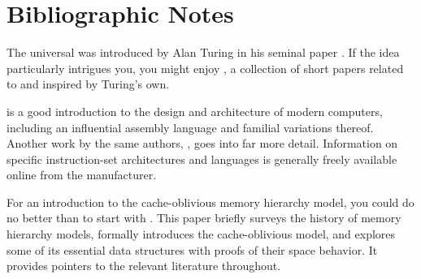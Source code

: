 \section{Bibliographic Notes}\label{background:computers:bibliographicnotes}
The universal \TM was introduced by Alan Turing in his seminal paper \citet{Turing:On-Computable:1937}. If the idea particularly intrigues you, you might enjoy \citet{Herken:The-Universal:1995}, a collection of short papers related to and inspired by Turing's own.

\citet{Patterson:Computer:2007} is a good introduction to the design and architecture of modern computers, including an influential  assembly language and familial variations thereof. Another work by the same authors, \citet{Hennessy:Computer:2006}, goes into far more detail. Information on specific instruction-set architectures and languages is generally freely available online from the manufacturer.

For an introduction to the cache-oblivious memory hierarchy model, you could do no better than to start with \citet{Demaine:Cache-Oblivious:2002}. This paper briefly surveys the history of memory hierarchy models, formally introduces the cache-oblivious model, and explores some of its essential data structures with proofs of their space behavior. It provides pointers to the relevant literature throughout.